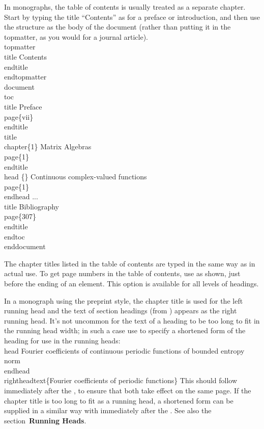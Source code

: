 In monographs, the table of contents is usually treated as a separate
chapter.  Start by typing the title ``Contents'' as for a preface or
introduction, and then use the  structure as the
body of the document (rather than putting it in the topmatter, as you
would for a journal article).
\beginexample{}
\\topmatter
\\title Contents\\endtitle
\\endtopmatter
\bigskip
\\document
\\toc
\\title Preface\\page\{vii\}\\endtitle
\\title\\chapter\{1\} Matrix Algebras\\page\{1\}\\endtitle
\\head \{\} Continuous complex-valued functions\\page\{1\}\\endhead
...
\\title Bibliography\\page\{307\}\\endtitle
\\endtoc
\\enddocument
\endexample

The chapter titles listed in the table of contents are typed in the same
way as in actual use.  To get page numbers in the table of contents, use
 as shown, just before the ending of an element.  This option
is available for all levels of headings.

In a monograph using the preprint style, the chapter title is used for
the left running head and the text of section headings
(from ) appears as the right running head.  
It's not uncommon for the text of a heading to be too long to fit
in the running head width; in such a case use  to
specify a shortened form of the heading for use in the running heads:
\beginexample{}
\\head Fourier coefficients of continuous periodic functions
of bounded entropy norm\\endhead
\\rightheadtext\{Fourier coefficients of periodic functions\}
\endexample
\noindent This should follow immediately after the , to ensure
that both take effect on the same page.  If the chapter title is too long
to fit as a running head, a shortened form can be supplied in a similar
way with  immediately after the .
See also the section~{\bf Running Heads}.

